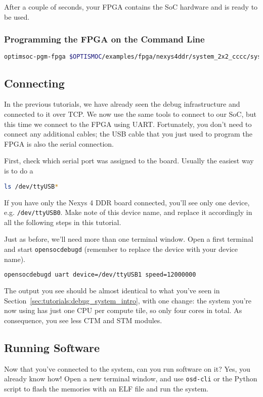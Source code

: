 After a couple of seconds, your FPGA contains the SoC hardware and is ready to be used.

\subsubsection{Programming the FPGA on the Command Line}
\begin{lstlisting}[language=sh]
optimsoc-pgm-fpga $OPTISMOC/examples/fpga/nexys4ddr/system_2x2_cccc/system_2x2_cccc_nexys4ddr.bit xc7a100t_0
\end{lstlisting}


\subsection{Connecting}
In the previous tutorials, we have already seen the debug infrastructure and connected to it over TCP.
We now use the same tools to connect to our SoC, but this time we connect to the FPGA using UART.
Fortunately, you don't need to connect any additional cables; the USB cable that you just used to program the FPGA is also the serial connection.

First, check which serial port was assigned to the board.
Usually the easiest way is to do a
\begin{lstlisting}[language=sh]
ls /dev/ttyUSB*
\end{lstlisting}

If you have only the Nexys 4 DDR board connected, you'll see only one device, e.g. \verb|/dev/ttyUSB0|.
Make note of this device name, and replace it accordingly in all the following steps in this tutorial.

Just as before, we'll need more than one terminal window.
Open a first terminal and start \verb|opensocdebugd| (remember to replace the device with your device name).
\begin{lstlisting}[language=sh]
opensocdebugd uart device=/dev/ttyUSB1 speed=12000000
\end{lstlisting}

The output you see should be almost identical to what you've seen in Section~\ref{sec:tutorials:debug_system_intro}, with one change:
the system you're now using has just one CPU per compute tile, so only four cores in total.
As consequence, you see less CTM and STM modules.

\subsection{Running Software}
Now that you've connected to the system, can you run software on it?
Yes, you already know how!
Open a new terminal window, and use \verb|osd-cli| or the Python script to flash the memories with an ELF file and run the system.

